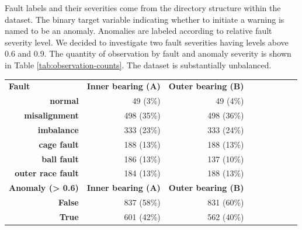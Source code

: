 Fault labels and their severities come from the directory structure within the dataset. The binary target variable indicating whether to initiate a warning is named to be an anomaly. Anomalies are labeled according to relative fault severity level. We decided to investigate two fault severities having levels above 0.6 and 0.9. The quantity of observation by fault and anomaly severity is shown in Table \ref{tab:observation-counts}. The dataset is substantially unbalanced.

\begin{table}[ht]
\centering
\renewcommand{\arraystretch}{1.2}
\begin{tabular}{rrrrrllll}
\cline{1-3}
\multicolumn{1}{|l|}{\textbf{Fault}}                                                                                          & \multicolumn{1}{l|}{\textbf{Inner bearing (A)}} & \multicolumn{1}{l|}{\textbf{Outer bearing (B)}} \\ \cline{1-3}
\multicolumn{1}{|r|}{\textbf{normal}}                 & \multicolumn{1}{r|}{49 (3\%)}                   & \multicolumn{1}{r|}{49 (4\%)}                    \\ \cline{1-3}
\multicolumn{1}{|r|}{\textbf{misalignment}}           & \multicolumn{1}{r|}{498 (35\%)}                 & \multicolumn{1}{r|}{498 (36\%)}                  \\ \cline{1-3}
\multicolumn{1}{|r|}{\textbf{imbalance}}              & \multicolumn{1}{r|}{333 (23\%)}                 & \multicolumn{1}{r|}{333 (24\%)}                  \\ \cline{1-3}
\multicolumn{1}{|r|}{\textbf{cage fault}}             & \multicolumn{1}{r|}{188 (13\%)}                 & \multicolumn{1}{r|}{188 (13\%)}                  \\ \cline{1-3}
\multicolumn{1}{|r|}{\textbf{ball fault}}             & \multicolumn{1}{r|}{186 (13\%)}                 & \multicolumn{1}{r|}{137 (10\%)}                  \\ \cline{1-3}
\multicolumn{1}{|r|}{\textbf{outer race fault}}       & \multicolumn{1}{r|}{184 (13\%)}                 & \multicolumn{1}{r|}{188 (13\%)}                  \\ \cline{1-3}

\multicolumn{1}{|l|}{\textbf{Anomaly (> 0.6)}}                                                                                          & \multicolumn{1}{l|}{\textbf{Inner bearing (A)}} & \multicolumn{1}{l|}{\textbf{Outer bearing (B)}} \\ \cline{1-3}
\multicolumn{1}{|r|}{\textbf{False}}                                                                            & \multicolumn{1}{r|}{837 (58\%)}                 & \multicolumn{1}{r|}{831 (60\%)}          \\ \cline{1-3}
\multicolumn{1}{|r|}{\textbf{True}}                                                                             & \multicolumn{1}{r|}{601 (42\%)}                 & \multicolumn{1}{r|}{562 (40\%)}          \\ \cline{1-3}


\end{tabular}
\end{table}
